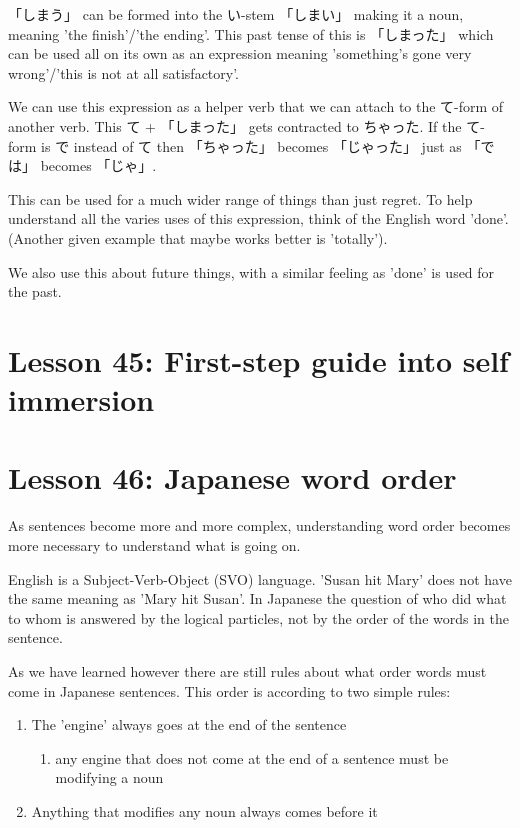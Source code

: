 \documentclass[11pt]{article}
\begin{document}
「しまう」 can be formed into the い-stem 「しまい」 making it a noun, meaning 'the finish'/'the ending'. This past tense of this is 「しまった」 which can be used all on its own as an expression meaning 'something's gone very wrong'​/'this is not at all satisfactory'.

We can use this expression as a helper verb that we can attach to the て-form of another verb. This て + 「しまった」 gets contracted to ちゃった. If the て-form is で instead of て then 「ちゃった」 becomes 「じゃった」 just as 「では」 becomes 「じゃ」.

This can be used for a much wider range of things than just regret. To help understand all the varies uses of this expression, think of the English word 'done'. (Another given example that maybe works better is 'totally').

We also use this about future things, with a similar feeling as 'done' is used for the past.

\section{Lesson 45: First-step guide into self immersion}
\label{sec:orgfa16097}

\section{Lesson 46: Japanese word order}
\label{sec:org23c22a7}
As sentences become more and more complex, understanding word order becomes more necessary to understand what is going on.

English is a Subject-Verb-Object (SVO) language. 'Susan hit Mary' does not have the same meaning as 'Mary hit Susan'. In Japanese the question of who did what to whom is answered by the logical particles, not by the order of the words in the sentence.

As we have learned however there are still rules about what order words must come in Japanese sentences. This order is according to two simple rules:
\begin{enumerate}
\item The 'engine' always goes at the end of the sentence
\begin{enumerate}
\item any engine that does not come at the end of a sentence must be modifying a noun
\end{enumerate}
\item Anything that modifies any noun always comes before it
\end{enumerate}
\end{document}

